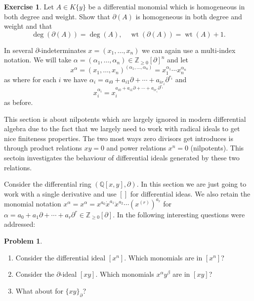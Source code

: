 \documentclass[12pt]{book}
\numberwithin{equation}{section}
\theoremstyle{definition}
\newtheorem{problem}[theorem]{Problem}
\newtheorem{exercise}[theorem]{Exercise}
\theoremstyle{remark}
\newcommand{\ZZ}{\mathbb{Z}}
\newcommand{\QQ}{\mathbb{Q}}
\newcommand{\wt}{\operatorname{wt}}
\begin{document}
\begin{exercise}
	Let $A \in K\lbrace y \rbrace$ be a differential monomial which is homogeneous in both degree and weight. Show that $\partial(A)$ is homogeneous in both degree and weight and that 
	$$ \deg(\partial(A)) = \deg(A), \quad \wt(\partial(A)) = \wt(A)+1.$$
\end{exercise}

In several $\partial$-indeterminates $x=(x_1,\ldots,x_n)$ we can again use a multi-index notation. 
We will take $\alpha = (\alpha_1,\ldots,\alpha_n) \in \ZZ_{\geq 0}[\partial]^n$ and let 
$$ x^{\alpha} = (x_1,\ldots,x_n)^{(\alpha_1,\ldots,\alpha_n)} = x_1^{\alpha_1}\cdots x_n^{\alpha_n}$$
as where for each $i$ we have $\alpha_i = a_{i0} + a_{i1}\partial + \cdots + a_{ir_i}\partial^{r_i}$ and
$$x_i^{\alpha_i} = x_i^{a_{i0} + a_{i1}\partial + \cdots + a_{ir_i}\partial^{r_i}}$$
as before. 

This section is about nilpotents which are largely ignored in modern differential algebra due to the fact that we largely need to work with radical ideals to get nice finiteness properties. 
The two most ways zero divisors get introduces is through product relations $xy=0$ and power relations $x^n=0$ (nilpotents).
This sectoin investigates the behaviour of differential ideals generated by these two relations.


Consider the differential ring $(\QQ[x,y],\partial)$.
In this section we are just going to work with a single derivative and use $[]$ for differential ideas. 
We also retain the monomial notation $x^{\alpha} = x^{\alpha}=x^{a_0}\dot{x}^{a_1} \ddot{x}^{a_2} \cdots (x^{(r)})^{a_r}$ for $\alpha = a_0 + a_1 \partial + \cdots + a_r \partial^r \in \ZZ_{\geq 0}[\partial]$.
In \cite{Levi1942} the following interesting questions were addressed:
\begin{problem}
	\begin{enumerate}
		\item Consider the differential ideal $[x^n]$.
		Which monomials  are in $[x^n]$? 
		\item Consider the $\partial$-ideal $[xy]$. 
		Which monomials $x^{\alpha}y^{\beta}$ are in $[xy]$?
		\item What about for $\lbrace xy \rbrace_{\partial}$?
	\end{enumerate}
\end{problem}
\end{document}
